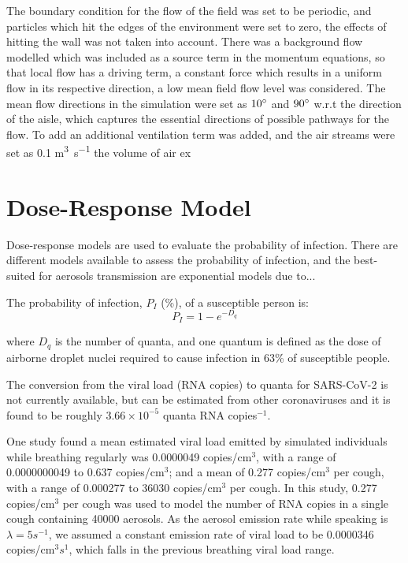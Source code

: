 \documentclass[11pt]{report}
\begin{document}
The boundary condition for the flow of the field was set to be periodic, and particles which hit the edges of the environment were set to zero, the effects of hitting the wall was not taken into account. There was a background flow modelled which was included as a source term in the momentum equations, so that local flow has a driving term, a constant force which results in a uniform flow in its respective direction, a low mean field flow level was considered. The mean flow directions in the simulation were set as $10 \degree$ and $90 \degree$ w.r.t the direction of the aisle, which captures the essential directions of possible pathways for the flow. To add an additional ventilation term was added, and the air streams were set as 0.1 \si{\meter^3\second^{-1}} the volume of air ex



\section{Dose-Response Model}
Dose-response models are used to evaluate the probability of infection. There are different models available to assess the probability of  infection, and the best-suited for aerosols transmission are exponential models due to...

The probability of infection, $P_I$ (\%), of a susceptible person is:
\begin{equation}\label{dose}
P_I = 1-e^{-D_q}
\end{equation}

where $D_q$ is the number of quanta, and one quantum is defined as the dose of airborne droplet nuclei required to cause infection in 63\% of susceptible people.

The conversion from the viral load (RNA copies) to quanta for SARS-CoV-2 is not currently available, but can be estimated from other coronaviruses and it is found to be roughly $3.66 \times 10^{-5}$ quanta RNA copies$^{-1}$.

One study found a mean estimated viral load emitted by simulated individuals while breathing regularly was 0.0000049 copies/cm$^3$, with a range of 0.0000000049 to 0.637 copies/cm$^3$; and a mean of 0.277 copies/cm$^3$ per cough, with a range of 0.000277 to 36030 copies/cm$^3$ per cough. In this study, 0.277 copies/cm$^3$ per cough was used to model the number of RNA copies in a single cough containing 40000 aerosols. As the aerosol emission rate while speaking is $\lambda = 5s^{-1}$, we assumed a constant emission rate of viral load to be 0.0000346 copies/cm$^3 s^{1}$, which falls in the previous breathing viral load range.
\end{document}
